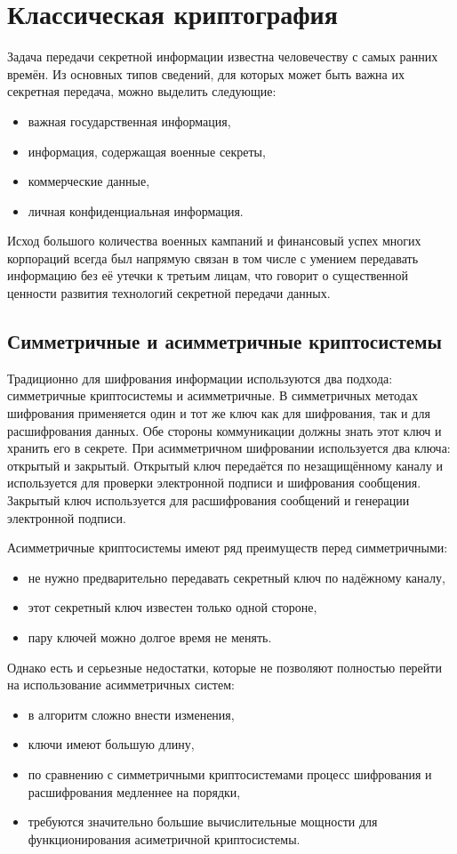 
\section{Классическая криптография}
Задача передачи секретной информации известна человечеству с самых ранних времён. Из основных типов сведений, для которых может быть важна их
секретная передача, можно выделить следующие:
\begin{itemize}
  \item важная государственная информация,
  \item информация, содержащая военные секреты,
  \item коммерческие данные,
  \item личная конфиденциальная информация.
\end{itemize}

Исход большого количества военных кампаний и финансовый успех многих корпораций всегда был напрямую связан в том числе с умением передавать
информацию без её утечки к третьим лицам, что говорит о существенной ценности развития технологий секретной передачи данных.

\subsection{Симметричные и асимметричные криптосистемы}
Традиционно для шифрования информации используются два подхода: симметричные криптосистемы и асимметричные.
В симметричных методах шифрования применяется один и тот же ключ как для шифрования, так и для расшифрования данных. Обе стороны коммуникации должны знать этот ключ и хранить его в секрете.
При асимметричном шифровании используется два ключа: открытый и закрытый. Открытый ключ передаётся по незащищённому каналу и используется для проверки электронной подписи и шифрования сообщения.
Закрытый ключ используется для расшифрования сообщений и генерации электронной подписи. 

Асимметричные криптосистемы имеют ряд преимуществ перед симметричными: 
\begin{itemize}
  \item не нужно предварительно передавать секретный ключ по надёжному каналу,
  \item этот секретный ключ известен только одной стороне, 
  \item пару ключей можно долгое время не менять.
\end{itemize}

Однако есть и серьезные недостатки, которые не позволяют полностью перейти на использование асимметричных систем: 
\begin{itemize}
  \item в алгоритм сложно внести изменения, 
  \item ключи имеют большую длину,
  \item по сравнению с симметричными криптосистемами процесс шифрования и расшифрования медленнее на порядки, 
  \item требуются значительно большие вычислительные мощности для функционирования асиметричной криптосистемы. 
\end{itemize}

